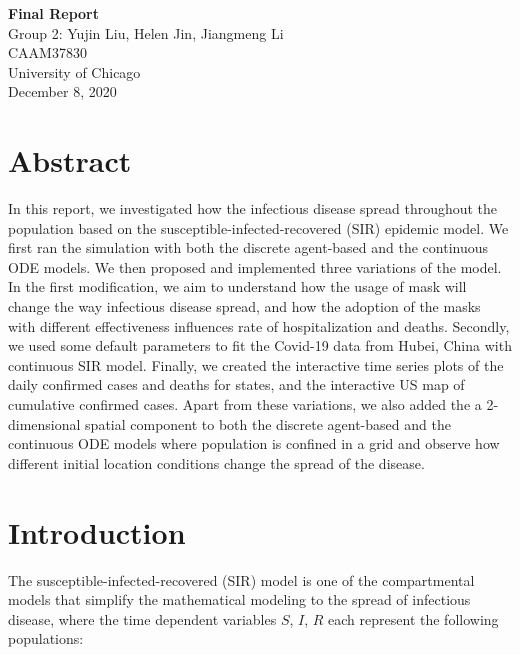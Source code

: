 \documentclass{article}
\begin{document}
\begin{titlepage}
  \begin{center}

    \huge
    \textbf{Final Report}\\
    \vspace{4.5cm}
    \LARGE
    Group 2: Yujin Liu, Helen Jin, Jiangmeng Li\\
    \vspace{4.5cm}
    \Large
    CAAM37830\\
    \vspace{1cm}
    University of Chicago\\
    \vspace{1cm}
    December 8, 2020

  \end{center}

\end{titlepage}

\section{Abstract}
In this report, we investigated how the infectious disease spread throughout the population based on the susceptible-infected-recovered (SIR) epidemic model. We first ran the simulation with both the discrete agent-based and the continuous ODE models. We then proposed and implemented three variations of the model. In the first modification, we aim to understand how the usage of mask will change the way infectious disease spread, and how the adoption of the masks with different effectiveness influences rate of hospitalization and deaths. Secondly, we used some default parameters to fit the Covid-19 data from Hubei, China with continuous SIR model. Finally, we created the interactive time series plots of the daily confirmed cases and deaths for states, and the interactive US map of cumulative confirmed cases. Apart from these variations, we also added the a 2-dimensional spatial component to both the discrete agent-based and the continuous ODE models where population is confined in a grid and observe how different initial location conditions change the spread of the disease.

\section{Introduction}
The susceptible-infected-recovered (SIR) model is one of the compartmental models that simplify the mathematical modeling to the spread of infectious disease, where the time dependent variables $S$, $I$, $R$ each represent the following populations:
\end{document}
